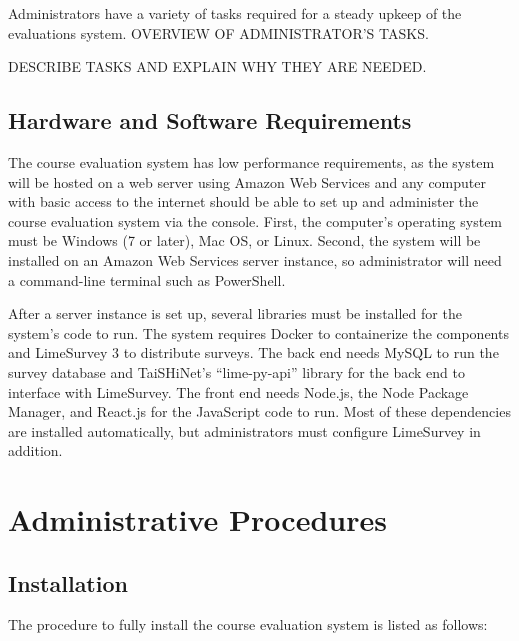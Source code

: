 \documentclass{article}
\begin{document}
Administrators have a variety of tasks required for a steady upkeep of the evaluations system. 
OVERVIEW OF ADMINISTRATOR'S TASKS.

DESCRIBE TASKS AND EXPLAIN WHY THEY ARE NEEDED.

\subsection{Hardware and Software Requirements}

The course evaluation system has low performance requirements, as the system will be hosted on a web server using Amazon Web Services and any computer with basic access to the internet should be able to set up and administer the course evaluation system via the console.  First, the computer's operating system must be Windows (7 or later), Mac OS, or Linux. Second, the system will be installed on an Amazon Web Services server instance, so administrator will need a command-line terminal such as PowerShell.

After a server instance is set up, several libraries must be installed for the system's code to run. The system requires Docker to containerize the components and LimeSurvey 3 to distribute surveys. The back end needs MySQL to run the survey database and TaiSHiNet's ``lime-py-api'' library for the back end to interface with LimeSurvey. The front end needs Node.js, the Node Package Manager, and React.js for the JavaScript code to run. Most of these dependencies are installed automatically, but administrators must configure LimeSurvey in addition.

\section{Administrative Procedures}

\subsection{Installation}

The procedure to fully install the course evaluation system is listed as follows:
\end{document}
